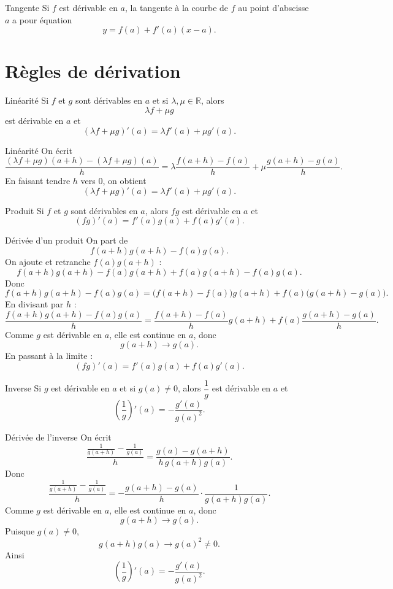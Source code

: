 \documentclass[11pt,a4paper]{article}
\newcommand{\R}{\mathbb{R}}
\begin{document}
\begin{definitionbox}{Tangente}
Si $f$ est dérivable en $a$, la tangente à la courbe de $f$ au point d'abscisse $a$ a pour équation
\[
y=f(a)+f'(a)(x-a).
\]
\end{definitionbox}

\section{Règles de dérivation}

\begin{theorembox}{Linéarité}
Si $f$ et $g$ sont dérivables en $a$ et si $\lambda,\mu\in\R$, alors
\[
\lambda f+\mu g
\]
est dérivable en $a$ et
\[
(\lambda f+\mu g)'(a)=\lambda f'(a)+\mu g'(a).
\]
\end{theorembox}

\begin{proofbox}{Linéarité}
On écrit
\[
\frac{(\lambda f+\mu g)(a+h)-(\lambda f+\mu g)(a)}{h}
=
\lambda\frac{f(a+h)-f(a)}{h}
+
\mu\frac{g(a+h)-g(a)}{h}.
\]
En faisant tendre $h$ vers $0$, on obtient
\[
(\lambda f+\mu g)'(a)=\lambda f'(a)+\mu g'(a).
\]
\end{proofbox}

\begin{theorembox}{Produit}
Si $f$ et $g$ sont dérivables en $a$, alors $fg$ est dérivable en $a$ et
\[
(fg)'(a)=f'(a)g(a)+f(a)g'(a).
\]
\end{theorembox}

\begin{proofbox}{Dérivée d'un produit}
On part de
\[
f(a+h)g(a+h)-f(a)g(a).
\]
On ajoute et retranche $f(a)g(a+h)$ :
\[
f(a+h)g(a+h)-f(a)g(a+h)+f(a)g(a+h)-f(a)g(a).
\]
Donc
\[
f(a+h)g(a+h)-f(a)g(a)
=
\bigl(f(a+h)-f(a)\bigr)g(a+h)
+
f(a)\bigl(g(a+h)-g(a)\bigr).
\]
En divisant par $h$ :
\[
\frac{f(a+h)g(a+h)-f(a)g(a)}{h}
=
\frac{f(a+h)-f(a)}{h}g(a+h)
+
f(a)\frac{g(a+h)-g(a)}{h}.
\]
Comme $g$ est dérivable en $a$, elle est continue en $a$, donc
\[
g(a+h)\to g(a).
\]
En passant à la limite :
\[
(fg)'(a)=f'(a)g(a)+f(a)g'(a).
\]
\end{proofbox}

\begin{theorembox}{Inverse}
Si $g$ est dérivable en $a$ et si $g(a)\neq0$, alors $\dfrac1g$ est dérivable en $a$ et
\[
\left(\frac1g\right)'(a)=-\frac{g'(a)}{g(a)^2}.
\]
\end{theorembox}

\begin{proofbox}{Dérivée de l'inverse}
On écrit
\[
\frac{\frac1{g(a+h)}-\frac1{g(a)}}{h}
=
\frac{g(a)-g(a+h)}{h\,g(a+h)g(a)}.
\]
Donc
\[
\frac{\frac1{g(a+h)}-\frac1{g(a)}}{h}
=
-\frac{g(a+h)-g(a)}{h}\cdot \frac1{g(a+h)g(a)}.
\]
Comme $g$ est dérivable en $a$, elle est continue en $a$, donc
\[
g(a+h)\to g(a).
\]
Puisque $g(a)\neq0$,
\[
g(a+h)g(a)\to g(a)^2\neq0.
\]
Ainsi
\[
\left(\frac1g\right)'(a)
=
-\frac{g'(a)}{g(a)^2}.
\]
\end{proofbox}
\end{document}
